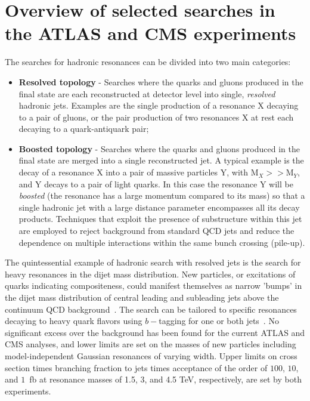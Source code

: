 \documentclass{PoS}
\begin{document}
\section{Overview of selected searches in the ATLAS and CMS experiments}

The searches for hadronic resonances can be divided into two main categories:
\begin{itemize}
 \item {\bf Resolved topology} - Searches where the quarks and gluons produced in the final state are each reconstructed at detector level into single,  \textit{resolved} hadronic jets. Examples are the single production of a resonance X decaying to a pair of gluons, or the pair production of two resonances X at rest each decaying to a quark-antiquark pair;
 \item {\bf Boosted topology} - Searches where the quarks and gluons produced in the final state are merged into a single reconstructed jet.  A typical example is the decay of a resonance X into a pair of massive particles Y, with $\mbox{M}_{X} >>\mbox{M}_{Y} $, and Y decays to a pair of light quarks. In this case the resonance Y will be \textit{boosted} 
(the resonance has a large momentum compared to its mass) so that a single hadronic jet with a large distance 
parameter encompasses all its decay products. Techniques that exploit the presence of substructure within this jet are employed to reject background from standard QCD jets and reduce the dependence on multiple interactions within the same bunch crossing (pile-up). 
\end{itemize}

The quintessential example of hadronic search with resolved jets is the 
search for heavy resonances in the dijet mass distribution. New particles, 
or excitations of quarks indicating 
compositeness,
could manifest 
themselves as narrow 'bumps' in the dijet mass distribution of central leading
and subleading jets above the continuum QCD background~\cite{CMS-PAS-EXO-12-059, ATLAS-CONF-2012-148}. 
The search can be tailored to specific resonances
decaying to heavy quark flavors using $b-$tagging for one or both jets~\cite{CMS-PAS-EXO-12-023}. 
No significant excess over the background has been found for the current ATLAS and CMS analyses,
and lower limits are set on the masses of new particles 
including model-independent Gaussian resonances of varying width.
Upper limits on cross section times branching fraction to jets times acceptance of the order of $100$, $10$, and 
$1$~fb at resonance masses of 1.5, 3, and 4.5 TeV, respectively, are set by both experiments.
\end{document}
